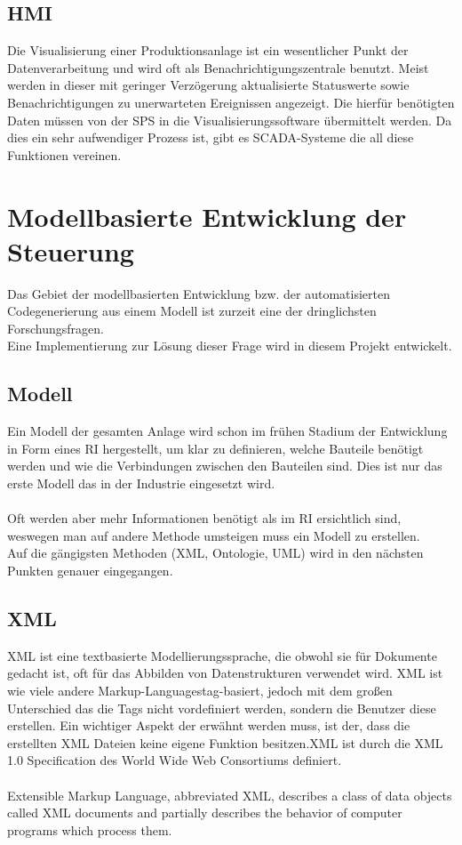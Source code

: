 \subsection{HMI}
Die Visualisierung einer Produktionsanlage ist ein wesentlicher Punkt der Datenverarbeitung und wird oft als Benachrichtigungszentrale benutzt. Meist werden in dieser mit geringer Verzögerung aktualisierte Statuswerte sowie Benachrichtigungen zu unerwarteten Ereignissen angezeigt. Die hierfür benötigten Daten müssen von der \ac{SPS} in die Visualisierungssoftware übermittelt werden. Da dies ein sehr aufwendiger Prozess ist, gibt es \ac{SCADA}-Systeme die all diese Funktionen vereinen.
\section{Modellbasierte Entwicklung der Steuerung} \label{modellbasierte_entwicklung}
Das Gebiet der modellbasierten Entwicklung bzw. der automatisierten Codegenerierung aus einem Modell ist zurzeit eine der dringlichsten Forschungsfragen.\\
Eine Implementierung zur Lösung dieser Frage wird in diesem Projekt entwickelt.
\subsection{Modell}
Ein Modell der gesamten Anlage wird schon im frühen Stadium der Entwicklung in Form eines \ac{RI} hergestellt, um klar zu definieren, welche Bauteile benötigt werden und wie die Verbindungen zwischen den Bauteilen sind. Dies ist nur das erste Modell das in der Industrie eingesetzt wird.\\
\\
Oft werden aber mehr Informationen benötigt als im \ac{RI} ersichtlich sind, weswegen man auf andere Methode umsteigen muss ein Modell zu erstellen.\\
Auf die gängigsten Methoden (\ac{XML}, Ontologie, \ac{UML}) wird in den nächsten Punkten genauer eingegangen.
\subsection{\ac{XML}}
\ac{XML} ist eine textbasierte Modellierungssprache, die obwohl sie für Dokumente gedacht ist, oft für das Abbilden von Datenstrukturen verwendet wird. \ac{XML} ist wie viele andere \glqq Markup-Languages\grqq\space tag-basiert, jedoch mit dem großen Unterschied das die Tags nicht vordefiniert werden, sondern die Benutzer diese erstellen. Ein wichtiger Aspekt der erwähnt werden muss, ist der, dass die erstellten \ac{XML} Dateien keine eigene Funktion besitzen.\ac{XML} ist durch die XML 1.0 Specification des World Wide Web Consortiums definiert.\\\\
\glqq Extensible Markup Language, abbreviated XML, describes a class of data objects called XML documents and partially describes the behavior of computer programs which process them.\grqq\space\cite{xml_ref}

